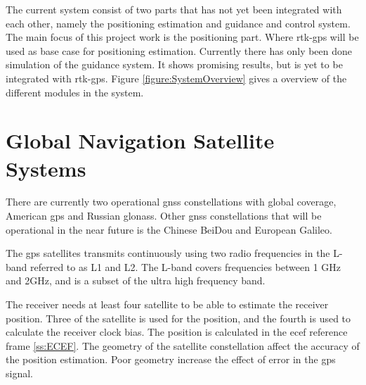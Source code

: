 

The current system consist of two parts that has not yet been integrated with each other, namely the positioning estimation and guidance and control system. The main focus of this project work is the positioning part. Where \gls{rtk-gps} will be used as base case for positioning estimation. Currently there has only been done simulation of the guidance system. It shows promising results, but is yet to be integrated with \gls{rtk-gps}. Figure \ref{figure:SystemOverview} gives a overview of the different modules in the system.

\section{Global Navigation Satellite Systems}
There are currently two operational \gls{gnss} constellations with global coverage, American \gls{gps} and Russian \gls{glonass}. Other \gls{gnss} constellations that will be operational in the near future is the Chinese BeiDou and European Galileo.

The \gls{gps} satellites transmits continuously using two radio frequencies in the L-band referred to as L1 and L2. The L-band covers frequencies between 1 GHz and 2GHz, and is a subset of the ultra high frequency band.

The receiver needs at least four satellite to be able to estimate the receiver position. Three of the satellite is used for the position, and the fourth is used to calculate the receiver clock bias. The position is calculated in the \gls{ecef} reference frame \ref{ss:ECEF}. The geometry of the satellite constellation affect the accuracy of the position estimation. Poor geometry increase the effect of error in the \gls{gps} signal.

